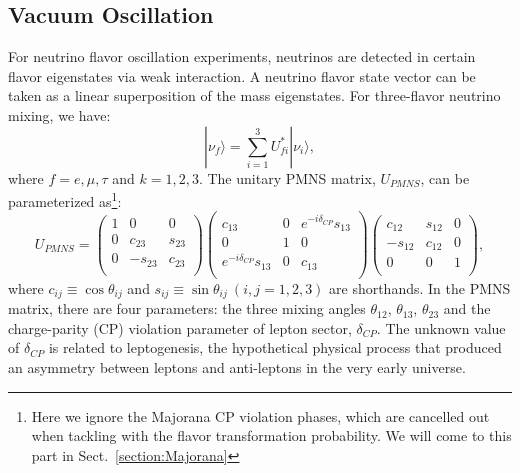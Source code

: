 \subsection{Vacuum Oscillation}\label{sectVacuumOsci}
For neutrino flavor oscillation experiments, neutrinos are detected in certain flavor eigenstates via weak interaction. A neutrino flavor state vector can be taken as a linear superposition of the mass eigenstates. For three-flavor neutrino mixing, we have\cite{pdg2020}:
\begin{equation}\label{eq:mixingmatrix}
|\nu_f\rangle = \sum_{i=1}^3U^*_{fi}|\nu_i\rangle, 
\end{equation}
where $f=e,\mu,\tau$ and $k=1,2,3$. The unitary PMNS matrix, $U_{PMNS}$, can be parameterized as\footnote{Here we ignore the Majorana CP violation phases, which are cancelled out when tackling with the flavor transformation probability. We will come to this part in Sect.~\ref{section:Majorana}}: 
\begin{equation}\label{eq:uPMNS}
U_{PMNS} =
\begin{pmatrix}
1 &0 &0\\
0 &c_{23} &s_{23}\\
0 &-s_{23} &c_{23}\\ 
\end{pmatrix}
\begin{pmatrix}
c_{13} &0 &e^{-i\delta_{CP}}s_{13}\\
0 &1 &0\\
e^{-i\delta_{CP}}s_{13} &0 &c_{13}\\ 
\end{pmatrix}
\begin{pmatrix}
c_{12} &s_{12} &0\\
-s_{12} &c_{12} &0\\
0 &0 &1\\ 
\end{pmatrix},
\end{equation}
where $c_{ij}\equiv \cos\theta_{ij}$ and $s_{ij}\equiv \sin\theta_{ij}~(i,j = 1,2,3)$ are shorthands.
In the PMNS matrix, there are four parameters: the three mixing angles $\theta_{12}$, $\theta_{13}$, $\theta_{23}$ and the charge-parity (CP) violation parameter of lepton sector, $\delta_{CP}$. The unknown value of $\delta_{CP}$ is related to leptogenesis, the hypothetical physical process that produced an asymmetry between leptons and anti-leptons in the very early universe\cite{wiki_cp}. 

